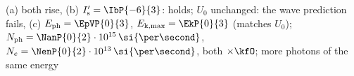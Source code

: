 (a) both rise, (b) $I_\mathrm{s}' = \IbP{-6}{3}$: holds; $U_0$ unchanged: the wave prediction fails, (c) $E_\mathrm{ph} = \EpVP{0}{3}$, $E_\mathrm{k,max} = \EkP{0}{3}$ (matches $U_0$); $N_\mathrm{ph} = \NanP{0}{2}\cdot 10^{15}\,\si{\per\second}$, $N_e = \NenP{0}{2}\cdot 10^{13}\,\si{\per\second}$, both $\times\kfO$; more photons of the same energy
